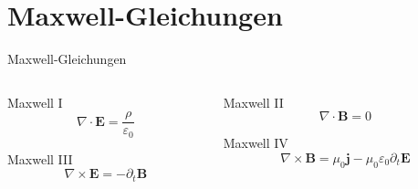 \documentclass[professionalfonts]{beamer}
\begin{document}
\section{Maxwell-Gleichungen}
\begin{frame}{Maxwell-Gleichungen}
  \begin{columns}[c, onlytextwidth]
    \begin{column}{0.45\textwidth}
      \begin{block}{Maxwell I}
        \begin{equation}
          \nabla \cdot \symbf{E} = \frac{ρ}{ε_0}
        \end{equation}
      \end{block}
      \begin{block}{Maxwell III}
        \begin{equation}
          \nabla \times \symbf{E} = - \partial_t \symbf{B}
        \end{equation}
      \end{block}
    \end{column}
    \begin{column}{0.5\textwidth}
      \begin{block}{Maxwell II}
        \begin{equation}
          \nabla \cdot \symbf{B} = 0
        \end{equation}
      \end{block}
      \begin{block}{Maxwell IV}
        \begin{equation}
          \nabla \times \symbf{B} = μ_0 \symbf{j} - μ_0 ε_0 \partial_t \symbf{E}
        \end{equation}
      \end{block}
    \end{column}
  \end{columns} 
\end{frame}
\end{document}
